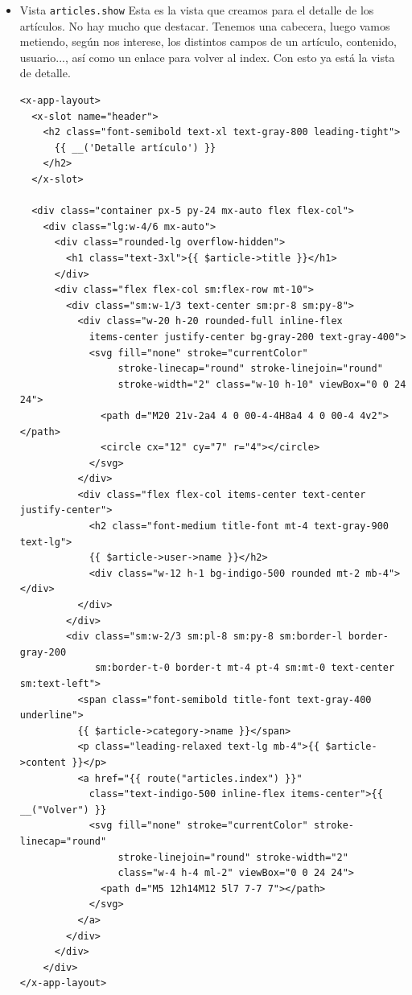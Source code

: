 \documentclass[11pt]{article}
\begin{document}
\begin{itemize}
\item Vista \texttt{articles.show}
\label{sec:org3d4bc35}
Esta es la vista que creamos para el detalle de los artículos. No hay
mucho que destacar. Tenemos una cabecera, luego vamos metiendo, según
nos interese, los distintos campos de un artículo, contenido, usuario...,
así como un enlace para volver al index. Con esto ya está la vista de detalle.
\begin{verbatim}
<x-app-layout>
  <x-slot name="header">
    <h2 class="font-semibold text-xl text-gray-800 leading-tight">
      {{ __('Detalle artículo') }}
    </h2>
  </x-slot>

  <div class="container px-5 py-24 mx-auto flex flex-col">
    <div class="lg:w-4/6 mx-auto">
      <div class="rounded-lg overflow-hidden">
        <h1 class="text-3xl">{{ $article->title }}</h1>
      </div>
      <div class="flex flex-col sm:flex-row mt-10">
        <div class="sm:w-1/3 text-center sm:pr-8 sm:py-8">
          <div class="w-20 h-20 rounded-full inline-flex
            items-center justify-center bg-gray-200 text-gray-400">
            <svg fill="none" stroke="currentColor"
                 stroke-linecap="round" stroke-linejoin="round"
                 stroke-width="2" class="w-10 h-10" viewBox="0 0 24 24">
              <path d="M20 21v-2a4 4 0 00-4-4H8a4 4 0 00-4 4v2"></path>
              <circle cx="12" cy="7" r="4"></circle>
            </svg>
          </div>
          <div class="flex flex-col items-center text-center justify-center">
            <h2 class="font-medium title-font mt-4 text-gray-900 text-lg">
            {{ $article->user->name }}</h2>
            <div class="w-12 h-1 bg-indigo-500 rounded mt-2 mb-4"></div>
          </div>
        </div>
        <div class="sm:w-2/3 sm:pl-8 sm:py-8 sm:border-l border-gray-200
             sm:border-t-0 border-t mt-4 pt-4 sm:mt-0 text-center sm:text-left">
          <span class="font-semibold title-font text-gray-400 underline">
          {{ $article->category->name }}</span>
          <p class="leading-relaxed text-lg mb-4">{{ $article->content }}</p>
          <a href="{{ route("articles.index") }}"
            class="text-indigo-500 inline-flex items-center">{{ __("Volver") }}
            <svg fill="none" stroke="currentColor" stroke-linecap="round"
                 stroke-linejoin="round" stroke-width="2"
                 class="w-4 h-4 ml-2" viewBox="0 0 24 24">
              <path d="M5 12h14M12 5l7 7-7 7"></path>
            </svg>
          </a>
        </div>
      </div>
    </div>
</x-app-layout>
\end{verbatim}

\newpage
\end{itemize}
\end{document}

